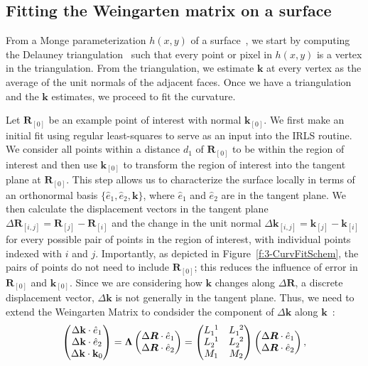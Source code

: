\subsection{Fitting the Weingarten matrix on a surface}
From a Monge parameterization $h(x,y)$ of a surface~\cite{RN35,RN23}, we start by computing the Delauney triangulation~\cite{RN34} such that every point or pixel in $h(x,y)$ is a vertex in the triangulation.
From the triangulation, we estimate $\mathbf{k}$ at every vertex as the average of the unit normals of the adjacent faces.
Once we have a triangulation and the $\mathbf{k}$ estimates, we proceed to fit the curvature.

Let $\mathbf{R}_{[0]}$ be an example point of interest with normal $\mathbf{k}_{[0]}$.
We first make an initial fit using regular least-squares to serve as an input into the IRLS routine.
We consider all points within a distance $d_1$ of $\mathbf{R}_{[0]}$ to be within the region of interest and then use $\mathbf{k}_{[0]}$ to transform the region of interest into the tangent plane at $\mathbf{R}_{[0]}$.
This step allows us to characterize the surface locally in terms of an orthonormal basis $\{\hat{e}_1,\hat{e}_2,\mathbf{k}\}$, where $\hat{e}_1$ and $\hat{e}_2$ are in the tangent plane.
We then calculate the displacement vectors in the tangent plane $\Delta \mathbf{R}_{[i,j]} = \mathbf{R}_{[j]}-\mathbf{R}_{[i]}$ and the change in the unit normal $\Delta \mathbf{k}_{[i,j]} = \mathbf{k}_{[j]}-\mathbf{k}_{[i]}$ for every possible pair of points in the region of interest, with individual points indexed with $i$ and $j$.
Importantly, as depicted in Figure~\ref{f:3-CurvFitSchem}, the pairs of points do not need to include $\mathbf{R}_{[0]}$; this reduces the influence of error in $\mathbf{R}_{[0]}$ and $\mathbf{k}_{[0]}$.
Since we are considering how $\mathbf{k}$ changes along $\Delta \mathbf{R}$, a discrete displacement vector, $\Delta \mathbf{k}$ is not generally in the tangent plane.
Thus, we need to extend the Weingarten Matrix to condsider the component of $\Delta \mathbf{k}$ along $\mathbf{k}$~\cite{RN31,RN32}:
\begin{equation}
\begin{pmatrix}
\Delta \mathbf{k} \cdot \hat{e}_1 \\
\Delta \mathbf{k} \cdot \hat{e}_2 \\
\Delta \mathbf{k} \cdot \mathbf{k}_0
\end{pmatrix}
=
\bm{\Lambda}
\begin{pmatrix}
\Delta \bm{R} \cdot \hat{e}_1 \\
\Delta \bm{R} \cdot \hat{e}_2
\end{pmatrix}
=
\begin{pmatrix}
\tensor{L}{_1^1} & \tensor{L}{_1^2} \\
\tensor{L}{_2^1} & \tensor{L}{_2^2} \\
M_{1} & M_{2}
\end{pmatrix}
\begin{pmatrix}
\Delta \bm{R} \cdot \hat{e}_1 \\
\Delta \bm{R} \cdot \hat{e}_2
\end{pmatrix},
\label{e:3-Kfit2}
\end{equation}
